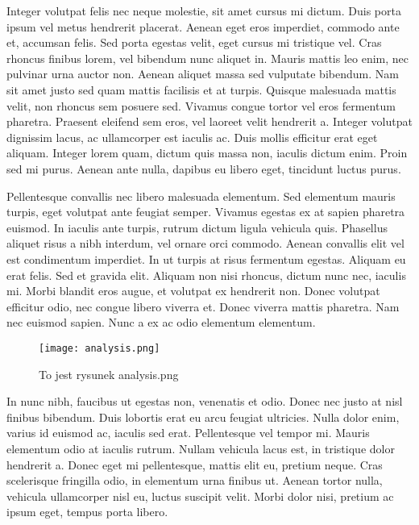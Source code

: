 \documentclass[12pt]{article}
\begin{document}
Integer volutpat felis nec neque molestie, sit amet cursus mi dictum. Duis porta ipsum vel metus hendrerit placerat. Aenean eget eros imperdiet, commodo ante et, accumsan felis. Sed porta egestas velit, eget cursus mi tristique vel. Cras rhoncus finibus lorem, vel bibendum nunc aliquet in. Mauris mattis leo enim, nec pulvinar urna auctor non. Aenean aliquet massa sed vulputate bibendum. Nam sit amet justo sed quam mattis facilisis et at turpis. Quisque malesuada mattis velit, non rhoncus sem posuere sed. Vivamus congue tortor vel eros fermentum pharetra. Praesent eleifend sem eros, vel laoreet velit hendrerit a. Integer volutpat dignissim lacus, ac ullamcorper est iaculis ac. Duis mollis efficitur erat eget aliquam. Integer lorem quam, dictum quis massa non, iaculis dictum enim. Proin sed mi purus. Aenean ante nulla, dapibus eu libero eget, tincidunt luctus purus.

Pellentesque convallis nec libero malesuada elementum. Sed elementum mauris turpis, eget volutpat ante feugiat semper. Vivamus egestas ex at sapien pharetra euismod. In iaculis ante turpis, rutrum dictum ligula vehicula quis. Phasellus aliquet risus a nibh interdum, vel ornare orci commodo. Aenean convallis elit vel est condimentum imperdiet. In ut turpis at risus fermentum egestas. Aliquam eu erat felis. Sed et gravida elit. Aliquam non nisi rhoncus, dictum nunc nec, iaculis mi. Morbi blandit eros augue, et volutpat ex hendrerit non. Donec volutpat efficitur odio, nec congue libero viverra et. Donec viverra mattis pharetra. Nam nec euismod sapien. Nunc a ex ac odio elementum elementum.

\begin{figure}[t]
    \centering
    
    \texttt{[image: analysis.png]}
    \caption{To jest rysunek analysis.png}
    \label{fig:analysis}
\end{figure}


In nunc nibh, faucibus ut egestas non, venenatis et odio. Donec nec justo at nisl finibus bibendum. Duis lobortis erat eu arcu feugiat ultricies. Nulla dolor enim, varius id euismod ac, iaculis sed erat. Pellentesque vel tempor mi. Mauris elementum odio at iaculis rutrum. Nullam vehicula lacus est, in tristique dolor hendrerit a. Donec eget mi pellentesque, mattis elit eu, pretium neque. Cras scelerisque fringilla odio, in elementum urna finibus ut. Aenean tortor nulla, vehicula ullamcorper nisl eu, luctus suscipit velit. Morbi dolor nisi, pretium ac ipsum eget, tempus porta libero.
\end{document}
